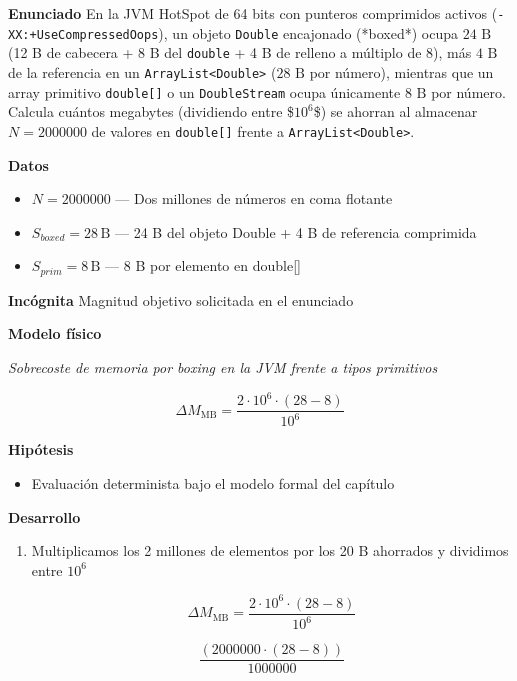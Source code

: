 \documentclass{book}
\begin{document}
\begin{tcolorbox}[title={Problema resuelto}, studiumworked, breakable]

\noindent\textbf{Enunciado}
En la JVM HotSpot de 64 bits con punteros comprimidos activos (\texttt{-XX:+UseCompressedOops}), un objeto \texttt{Double} encajonado (*boxed*) ocupa \(24\text{ B}\) (12 B de cabecera + 8 B del \texttt{double} + 4 B de relleno a múltiplo de 8), más \(4\text{ B}\) de la referencia en un \texttt{ArrayList<Double>} (\(28\text{ B}\) por número), mientras que un array primitivo \texttt{double[]} o un \texttt{DoubleStream} ocupa únicamente \(8\text{ B}\) por número. Calcula cuántos megabytes (dividiendo entre \$\(10^6\)\$) se ahorran al almacenar \(N = 2000000\) de valores en \texttt{double[]} frente a \texttt{ArrayList<Double>}.

\noindent\textbf{Datos}
\begin{itemize}
\item $N = 2000000$ — Dos millones de números en coma flotante
\item $S_{boxed} = 28\,\mathrm{B}$ — 24 B del objeto Double + 4 B de referencia comprimida
\item $S_{prim} = 8\,\mathrm{B}$ — 8 B por elemento en double[]
\end{itemize}

\noindent\textbf{Incógnita}
Magnitud objetivo solicitada en el enunciado

\noindent\textbf{Modelo físico}

\noindent\textit{Sobrecoste de memoria por boxing en la JVM frente a tipos primitivos}

\[
\Delta M_{\text{MB}} = \frac{2 \cdot 10^6 \cdot (28 - 8)}{10^6}
\]

\noindent\textbf{Hipótesis}
\begin{itemize}
\item Evaluación determinista bajo el modelo formal del capítulo
\end{itemize}

\noindent\textbf{Desarrollo}
\begin{enumerate}
\item
Multiplicamos los 2 millones de elementos por los 20 B ahorrados y dividimos entre \(10^6\)

\[
\Delta M_{\text{MB}} = \frac{2 \cdot 10^6 \cdot (28 - 8)}{10^6}
\]

\[
\frac{\left(2000000\cdot \left(28-8\right)\right)}{1000000}
\]
\end{enumerate}


\end{tcolorbox}
\end{document}
